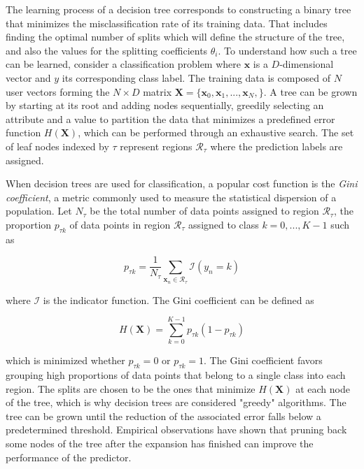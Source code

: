 \documentclass{kththesis}
\begin{document}
The learning process of a decision tree corresponds to constructing a binary tree that minimizes the misclassification rate of its training data. That includes finding the optimal number of splits which will define the structure of the tree, and also the values for the splitting coefficients $\theta_i$. To understand how such a tree can be learned, consider a classification problem where $\mathbf{x}$ is a $D$-dimensional vector and $y$ its corresponding class label. The training data is composed of $N$ user vectors forming the $N \times D$ matrix $\mathbf{X} = \{\mathbf{x}_0, \mathbf{x}_1, ..., \mathbf{x}_N,\}$. A tree can be grown by starting at its root and adding nodes sequentially, greedily selecting an attribute and a value to partition the data that minimizes a predefined error function $H(\mathbf{X})$, which can be performed through an exhaustive search. The set of leaf nodes indexed by $\tau$ represent regions $\mathcal{R}_\tau$ where the prediction labels are assigned.

When decision trees are used for classification, a popular cost function is the \emph{Gini coefficient}, a metric commonly used to measure the statistical dispersion of a population. Let $N_\tau$ be the total number of data points assigned to region $\mathcal{R}_\tau$,  the proportion $p_{\tau k}$ of data points in region $\mathcal{R}_\tau$ assigned to class $k = 0,...,K-1$ such as 

\begin{equation}
p_{\tau k} = \frac{1}{N_\tau} \sum_{\mathbf{x}_n \in \mathcal{R}_\tau} \mathcal{I}(y_n = k)
\end{equation}
 
 where $\mathcal{I}$ is the indicator function. The Gini coefficient can be defined as 
 
 \begin{equation}
 H(\mathbf{X}) = \sum_{k=0}^{K-1} p_{\tau k} (1-p_{\tau k})
 \end{equation}
 
which is minimized whether $p_{\tau k}=0$ or $p_{\tau k}=1$. The Gini coefficient favors grouping high proportions of data points that belong to a single class into each region. The splits are chosen to be the ones that minimize $H(\mathbf{X})$ at each node of the tree, which is why decision trees are considered "greedy" algorithms. The tree can be grown until the reduction of the associated error falls below a predetermined threshold. Empirical observations have shown that pruning back some nodes of the tree after the expansion has finished can improve the performance of the predictor.
 
\end{document}
